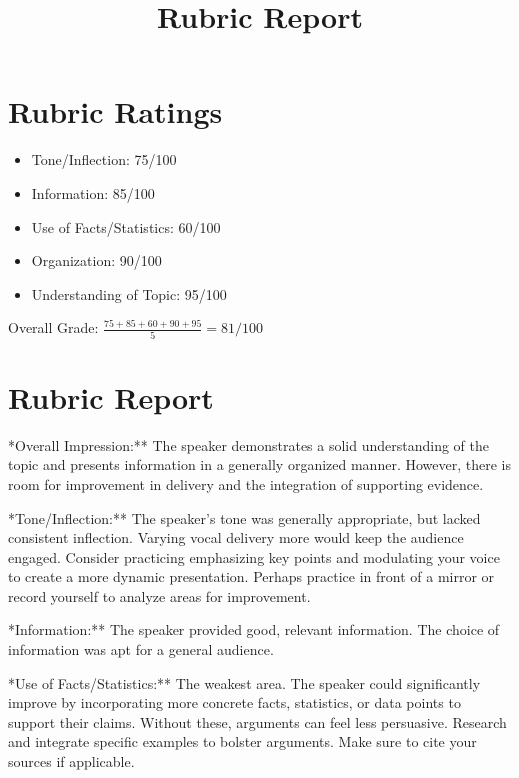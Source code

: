 \documentclass{article}
\title{Rubric Report}
\date{}
\begin{document}
\maketitle

\section*{Rubric Ratings}

\begin{itemize}
    \item Tone/Inflection: 75/100
    \item Information: 85/100
    \item Use of Facts/Statistics: 60/100
    \item Organization: 90/100
    \item Understanding of Topic: 95/100
\end{itemize}

\noindent Overall Grade: $\frac{75+85+60+90+95}{5} = 81/100$

\section*{Rubric Report}

\noindent **Overall Impression:** The speaker demonstrates a solid understanding of the topic and presents information in a generally organized manner. However, there is room for improvement in delivery and the integration of supporting evidence.

\vspace{0.1in}
\noindent **Tone/Inflection:** The speaker's tone was generally appropriate, but lacked consistent inflection. Varying vocal delivery more would keep the audience engaged. Consider practicing emphasizing key points and modulating your voice to create a more dynamic presentation. Perhaps practice in front of a mirror or record yourself to analyze areas for improvement.

\vspace{0.1in}
\noindent **Information:** The speaker provided good, relevant information. The choice of information was apt for a general audience.

\vspace{0.1in}
\noindent **Use of Facts/Statistics:** The weakest area. The speaker could significantly improve by incorporating more concrete facts, statistics, or data points to support their claims. Without these, arguments can feel less persuasive. Research and integrate specific examples to bolster arguments. Make sure to cite your sources if applicable.
\end{document}
